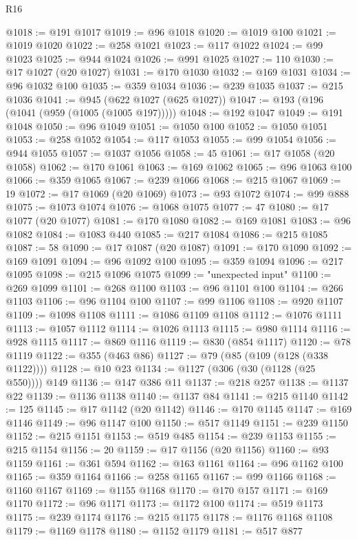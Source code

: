 \begin{lexlean}{R16}
\begin{coremodule}
@1018 := @191 @1017
@1019 := @96 @1018
@1020 := @1019 @100
@1021 := @1019 @1020
@1022 := @258 @1021
@1023 := @117 @1022
@1024 := @99 @1023
@1025 := @944 @1024
@1026 := @991 @1025
@1027 := 110
@1030 := @17 @1027 (@20 @1027)
@1031 := @170 @1030
@1032 := @169 @1031
@1034 := @96 @1032 @100
@1035 := @359 @1034
@1036 := @239 @1035
@1037 := @215 @1036
@1041 := @945 (@622 @1027 (@625 @1027))
@1047 := @193 (@196 (@1041 (@959 (@1005 (@1005 @197)))))
@1048 := @192 @1047
@1049 := @191 @1048
@1050 := @96 @1049
@1051 := @1050 @100
@1052 := @1050 @1051
@1053 := @258 @1052
@1054 := @117 @1053
@1055 := @99 @1054
@1056 := @944 @1055
@1057 := @1037 @1056
@1058 := 45
@1061 := @17 @1058 (@20 @1058)
@1062 := @170 @1061
@1063 := @169 @1062
@1065 := @96 @1063 @100
@1066 := @359 @1065
@1067 := @239 @1066
@1068 := @215 @1067
@1069 := 19
@1072 := @17 @1069 (@20 @1069)
@1073 := @93 @1072
@1074 := @99 @888
@1075 := @1073 @1074
@1076 := @1068 @1075
@1077 := 47
@1080 := @17 @1077 (@20 @1077)
@1081 := @170 @1080
@1082 := @169 @1081
@1083 := @96 @1082
@1084 := @1083 @440
@1085 := @217 @1084
@1086 := @215 @1085
@1087 := 58
@1090 := @17 @1087 (@20 @1087)
@1091 := @170 @1090
@1092 := @169 @1091
@1094 := @96 @1092 @100
@1095 := @359 @1094
@1096 := @217 @1095
@1098 := @215 @1096 @1075
@1099 := "unexpected input"
@1100 := @269 @1099
@1101 := @268 @1100
@1103 := @96 @1101 @100
@1104 := @266 @1103
@1106 := @96 @1104 @100
@1107 := @99 @1106
@1108 := @920 @1107
@1109 := @1098 @1108
@1111 := @1086 @1109 @1108
@1112 := @1076 @1111
@1113 := @1057 @1112
@1114 := @1026 @1113
@1115 := @980 @1114
@1116 := @928 @1115
@1117 := @869 @1116
@1119 := @830 (@854 @1117)
@1120 := @78 @1119
@1122 := @355 (@463 @86)
@1127 := @79 (@85 (@109 (@128 (@338 @1122))))
@1128 := @10 @23
@1134 := @1127 (@306 (@30 (@1128 (@25 @550)))) @149
@1136 := @147 @386 @11
@1137 := @218 @257
@1138 := @1137 @22
@1139 := @1136 @1138
@1140 := @1137 @84
@1141 := @215 @1140
@1142 := 125
@1145 := @17 @1142 (@20 @1142)
@1146 := @170 @1145
@1147 := @169 @1146
@1149 := @96 @1147 @100
@1150 := @517 @1149
@1151 := @239 @1150
@1152 := @215 @1151
@1153 := @519 @485
@1154 := @239 @1153
@1155 := @215 @1154
@1156 := 20
@1159 := @17 @1156 (@20 @1156)
@1160 := @93 @1159
@1161 := @361 @594
@1162 := @163 @1161
@1164 := @96 @1162 @100
@1165 := @359 @1164
@1166 := @258 @1165
@1167 := @99 @1166
@1168 := @1160 @1167
@1169 := @1155 @1168
@1170 := @170 @157
@1171 := @169 @1170
@1172 := @96 @1171
@1173 := @1172 @100
@1174 := @519 @1173
@1175 := @239 @1174
@1176 := @215 @1175
@1178 := @1176 @1168 @1108
@1179 := @1169 @1178
@1180 := @1152 @1179
@1181 := @517 @877

\end{coremodule}
\end{lexlean}
